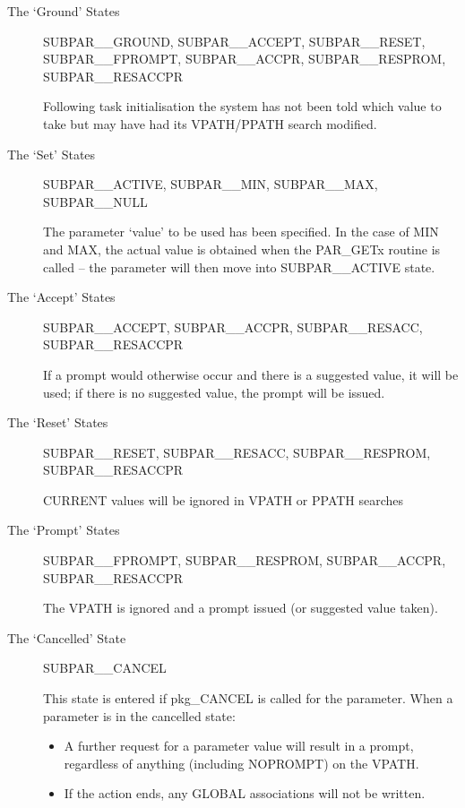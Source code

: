 \begin{description}
\item[The `Ground' States]
SUBPAR\_\_GROUND, SUBPAR\_\_ACCEPT, SUBPAR\_\_RESET, \\
SUBPAR\_\_FPROMPT, SUBPAR\_\_ACCPR, SUBPAR\_\_RESPROM, \\
SUBPAR\_\_RESACCPR

Following task initialisation the system has not been told which value to take
but may have had its VPATH/PPATH search modified.

\item[The `Set' States]
SUBPAR\_\_ACTIVE, SUBPAR\_\_MIN, SUBPAR\_\_MAX, \\
SUBPAR\_\_NULL

The parameter `value' to be used has been specified. In the case of MIN and
MAX, the actual value is obtained when the PAR\_GETx routine is called --
the parameter will then move into SUBPAR\_\_ACTIVE state.

\item[The `Accept' States]
SUBPAR\_\_ACCEPT, SUBPAR\_\_ACCPR, SUBPAR\_\_RESACC, \\
SUBPAR\_\_RESACCPR

If a prompt would otherwise occur and there is a suggested value, it will be
used; if there is no suggested value, the prompt will be issued.

\item[The `Reset' States]
SUBPAR\_\_RESET, SUBPAR\_\_RESACC, SUBPAR\_\_RESPROM, \\
SUBPAR\_\_RESACCPR

CURRENT values will be ignored in VPATH or PPATH searches

\item[The `Prompt' States]
SUBPAR\_\_FPROMPT, SUBPAR\_\_RESPROM, SUBPAR\_\_ACCPR, SUBPAR\_\_RESACCPR

The VPATH is ignored and a prompt issued (or suggested value taken).


\item[The `Cancelled' State]
SUBPAR\_\_CANCEL

This state is entered if pkg\_CANCEL is called for the parameter.
When a parameter is in the cancelled state:
\begin{itemize}
\item A further request for a parameter value will result in a prompt,
regardless of anything (including NOPROMPT) on the VPATH.
\item If the action ends, any GLOBAL associations will not be written.
\end{itemize}
\end{description}

